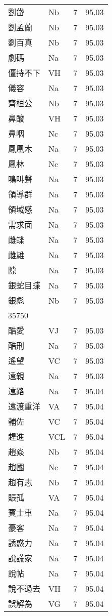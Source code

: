 \documentclass[twocolumn]{book}
\begin{document}
\begin{supertabular}{llrr}
劉岱 & Nb & 7 &  95.03\\
劉孟蘭 & Nb & 7 &  95.03\\
劉百真 & Nb & 7 &  95.03\\
劇碼 & Na & 7 &  95.03\\
僵持不下 & VH & 7 &  95.03\\
儀容 & Na & 7 &  95.03\\
齊桓公 & Nb & 7 &  95.03\\
鼻酸 & VH & 7 &  95.03\\
鼻咽 & Nc & 7 &  95.03\\
鳳凰木 & Na & 7 &  95.03\\
鳳林 & Nc & 7 &  95.03\\
鳴叫聲 & Na & 7 &  95.03\\
領導群 & Na & 7 &  95.03\\
領域感 & Na & 7 &  95.03\\
需求面 & Na & 7 &  95.03\\
雌蝶 & Na & 7 &  95.03\\
雌雄 & Na & 7 &  95.03\\
隙 & Na & 7 &  95.03\\
銀蛇目蝶 & Na & 7 &  95.03\\
銀彪 & Nb & 7 &  95.03\\
35750\\
酷愛 & VJ & 7 &  95.03\\
酷刑 & Na & 7 &  95.03\\
遙望 & VC & 7 &  95.03\\
遠親 & Na & 7 &  95.03\\
遠路 & Na & 7 &  95.04\\
遠渡重洋 & VA & 7 &  95.04\\
輔佐 & VC & 7 &  95.04\\
趕進 & VCL & 7 &  95.04\\
趙焱 & Nb & 7 &  95.04\\
趙國 & Nc & 7 &  95.04\\
趙有志 & Nb & 7 &  95.04\\
賑孤 & VA & 7 &  95.04\\
賓士車 & Na & 7 &  95.04\\
豪客 & Na & 7 &  95.04\\
誘惑力 & Na & 7 &  95.04\\
說謊家 & Na & 7 &  95.04\\
說帖 & Na & 7 &  95.04\\
說不過去 & VH & 7 &  95.04\\
誤解為 & VG & 7 &  95.04\\

\end{supertabular}
\end{document}
